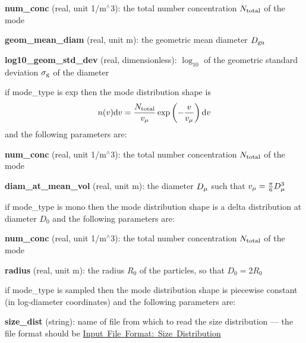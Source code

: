 \begin{DoxyItemize}
\begin{DoxyItemize}
\item {\bfseries num\+\_\+conc} (real, unit 1/m$^\wedge$3)\+: the total number concentration $N_{\rm total}$ of the mode 
\item {\bfseries geom\+\_\+mean\+\_\+diam} (real, unit m)\+: the geometric mean diameter $D_{\rm gn}$ 
\item {\bfseries log10\+\_\+geom\+\_\+std\+\_\+dev} (real, dimensionless)\+: $\log_{10}$ of the geometric standard deviation $\sigma_{\rm g}$ of the diameter 
\end{DoxyItemize}
\item if {\ttfamily mode\+\_\+type} is {\ttfamily exp} then the mode distribution shape is \[ n(v) {\rm d}v = \frac{N_{\rm total}}{v_{\rm \mu}} \exp\left(- \frac{v}{v_{\rm \mu}}\right) {\rm d}v \] and the following parameters are\+: 
\begin{DoxyItemize}
\item {\bfseries num\+\_\+conc} (real, unit 1/m$^\wedge$3)\+: the total number concentration $N_{\rm total}$ of the mode 
\item {\bfseries diam\+\_\+at\+\_\+mean\+\_\+vol} (real, unit m)\+: the diameter $D_{\rm \mu}$ such that $v_{\rm \mu} = \frac{\pi}{6} D^3_{\rm \mu}$ 
\end{DoxyItemize}
\item if {\ttfamily mode\+\_\+type} is {\ttfamily mono} then the mode distribution shape is a delta distribution at diameter $D_0$ and the following parameters are\+: 
\begin{DoxyItemize}
\item {\bfseries num\+\_\+conc} (real, unit 1/m$^\wedge$3)\+: the total number concentration $N_{\rm total}$ of the mode 
\item {\bfseries radius} (real, unit m)\+: the radius $R_0$ of the particles, so that $D_0 = 2 R_0$ 
\end{DoxyItemize}
\item if {\ttfamily mode\+\_\+type} is {\ttfamily sampled} then the mode distribution shape is piecewise constant (in log-\/diameter coordinates) and the following parameters are\+: 
\begin{DoxyItemize}
\item {\bfseries size\+\_\+dist} (string)\+: name of file from which to read the size distribution --- the file format should be \mbox{\hyperlink{input_format_size_dist}{Input File Format\+: Size Distribution}} 
\end{DoxyItemize}
\end{DoxyItemize}

